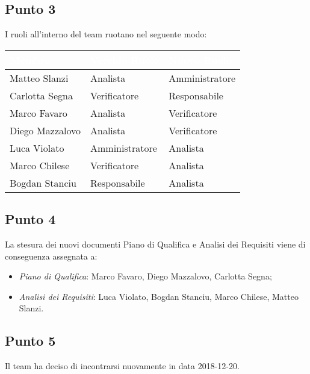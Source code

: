 \subsection{Punto 3}
I ruoli all'interno del team ruotano nel seguente modo:\\
\begin{center}
\begin{longtable}[c]{|m{}|m{}|m{}|} 
\hline
\rowcolor{bluelogo}\textbf{\textcolor{white}{Membro}} & \textbf{\textcolor{white}{Vecchio Ruolo}} & \textbf{\textcolor{white}{Nuovo Ruolo}}\\
\hline
Matteo Slanzi & Analista & Amministratore\\
\hline
\rowcolor{grigio}Carlotta Segna & Verificatore & Responsabile\\
\hline
Marco Favaro & Analista & Verificatore\\
\hline
\rowcolor{grigio}Diego Mazzalovo & Analista & Verificatore\\
\hline
Luca Violato & Amministratore & Analista\\
\hline
\rowcolor{grigio}Marco Chilese & Verificatore & Analista\\
\hline
Bogdan Stanciu & Responsabile & Analista\\
\hline
\end{longtable}
\end{center}

\subsection{Punto 4}
La stesura dei nuovi documenti Piano di Qualifica e Analisi dei Requisiti viene di conseguenza assegnata a:
\begin{itemize}
	\item \textit{Piano di Qualifica}: Marco Favaro, Diego Mazzalovo, Carlotta Segna;
	\item \textit{Analisi dei Requisiti}: Luca Violato, Bogdan Stanciu, Marco Chilese, Matteo Slanzi.
\end{itemize}

\subsection{Punto 5}
Il team ha deciso di incontrarsi nuovamente in data 2018-12-20.
